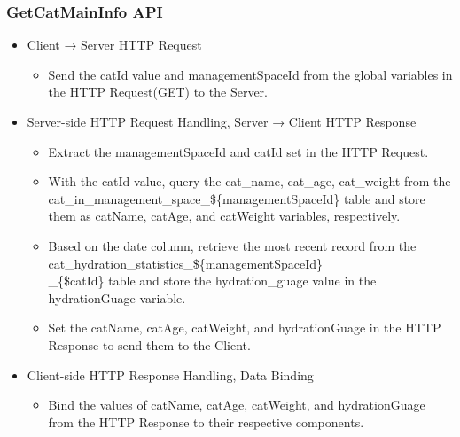 \documentclass[conference]{IEEEtran}
\begin{document}
\subsubsection{GetCatMainInfo API}
\begin{itemize}
    \item Client → Server HTTP Request
    \begin{itemize}
        \item Send the catId value and managementSpaceId from the global variables in the HTTP Request(GET) to the Server.
        \\
    \end{itemize}
    \item Server-side HTTP Request Handling, Server → Client HTTP Response
    \begin{itemize}
        \item Extract the managementSpaceId and catId set in the HTTP Request.
        \item With the catId value, query the cat\_name, cat\_age, cat\_weight from the cat\_in\_management\_space\_\$\{managementSpaceId\} table and store them as catName, catAge, and catWeight variables, respectively.
        \item Based on the date column, retrieve the most recent record from the cat\_hydration\_statistics\_\$\{managementSpaceId\}\\\_\{\$catId\} table and store the hydration\_guage value in the hydrationGuage variable.
        \item Set the catName, catAge, catWeight, and hydrationGuage in the HTTP Response to send them to the Client.
        \\
    \end{itemize}
    \item Client-side HTTP Response Handling, Data Binding
    \begin{itemize}
        \item Bind the values of catName, catAge, catWeight, and hydrationGuage from the HTTP Response to their respective components.
        \\
    \end{itemize}
\end{itemize}
\end{document}
